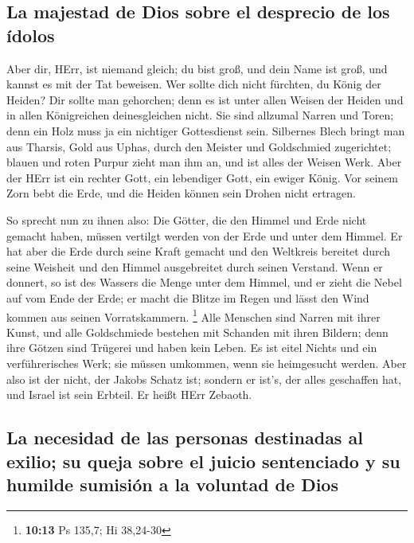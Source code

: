 \hypertarget{la-majestad-de-dios-sobre-el-desprecio-de-los-uxeddolos}{%
\subsection{La majestad de Dios sobre el desprecio de los
ídolos}\label{la-majestad-de-dios-sobre-el-desprecio-de-los-uxeddolos}}

 Aber dir, HErr, ist niemand gleich; du bist groß, und
dein Name ist groß, und kannst es mit der Tat beweisen. 
Wer sollte dich nicht fürchten, du König der Heiden? Dir sollte man
gehorchen; denn es ist unter allen Weisen der Heiden und in allen
Königreichen deinesgleichen nicht.  Sie sind allzumal
Narren und Toren; denn ein Holz muss ja ein nichtiger Gottesdienst sein.
 Silbernes Blech bringt man aus Tharsis, Gold aus Uphas,
durch den Meister und Goldschmied zugerichtet; blauen und roten Purpur
zieht man ihm an, und ist alles der Weisen Werk.  Aber
der HErr ist ein rechter Gott, ein lebendiger Gott, ein ewiger König.
Vor seinem Zorn bebt die Erde, und die Heiden können sein Drohen nicht
ertragen.

 So sprecht nun zu ihnen also: Die Götter, die den Himmel
und Erde nicht gemacht haben, müssen vertilgt werden von der Erde und
unter dem Himmel.  Er hat aber die Erde durch seine Kraft
gemacht und den Weltkreis bereitet durch seine Weisheit und den Himmel
ausgebreitet durch seinen Verstand.  Wenn er donnert, so
ist des Wassers die Menge unter dem Himmel, und er zieht die Nebel auf
vom Ende der Erde; er macht die Blitze im Regen und lässt den Wind
kommen aus seinen Vorratskammern. \footnote{\textbf{10:13} Ps 135,7; Hi
  38,24-30}  Alle Menschen sind Narren mit ihrer Kunst,
und alle Goldschmiede bestehen mit Schanden mit ihren Bildern; denn ihre
Götzen sind Trügerei und haben kein Leben.  Es ist eitel
Nichts und ein verführerisches Werk; sie müssen umkommen, wenn sie
heimgesucht werden.  Aber also ist der nicht, der Jakobs
Schatz ist; sondern er ist's, der alles geschaffen hat, und Israel ist
sein Erbteil. Er heißt HErr Zebaoth.

\hypertarget{la-necesidad-de-las-personas-destinadas-al-exilio-su-queja-sobre-el-juicio-sentenciado-y-su-humilde-sumisiuxf3n-a-la-voluntad-de-dios}{%
\subsection{La necesidad de las personas destinadas al exilio; su queja
sobre el juicio sentenciado y su humilde sumisión a la voluntad de
Dios}\label{la-necesidad-de-las-personas-destinadas-al-exilio-su-queja-sobre-el-juicio-sentenciado-y-su-humilde-sumisiuxf3n-a-la-voluntad-de-dios}}

